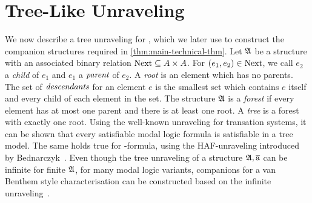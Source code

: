 
\section{Tree-Like Unraveling}\label{sec:unraveling}
We now describe a tree unraveling for \FGF, which we later use to construct the companion structures required in \cref{thm:main-technical-thm}.
Let ${\mathfrak{A}}$ be a structure with an associated binary relation $\mathrm{Next} \subseteq A \times A$.
For $(e_{1}, e_{2}) \in \mathrm{Next}$, we call $e_{2}$ a \emph{child} of $e_{1}$ and $e_{1}$ a $\emph{parent}$ of $e_{2}$.
A \emph{root} is an element which has no parents.
The set of $\emph{descendants}$ for an element $e$ is the smallest set which contains $e$ itself and every child of each element in the set.
The structure ${\mathfrak{A}}$ is a \emph{forest} if every element has at most one parent and there is at least one root.
A \emph{tree} is a forest with exactly one root.
Using the well-known unraveling for transation systems, it can be shown that every satisfiable modal logic formula is satisfiable in a tree model.
The same holds true for \FGF-formula, using the HAF-unraveling introduced by Bednarczyk~\cite[Sec 3.3]{Bednarczyk21}.
Even though the tree unraveling of a structure ${\mathfrak{A}}, \overline{\mathrm{a}}$ can be infinite for finite ${\mathfrak{A}}$,
for many modal logic variants, companions for a van Benthem style characterisation can be constructed based on the infinite unraveling~\cite{Otto04}.

